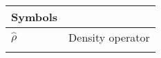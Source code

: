 \begin{center}
	\small
	\begin{longtable}{ll}
	\toprule
	Symbols & {} \\
	\bottomrule
	$\hat{\rho}$		& Density operator \\
	\etc{}					& \etc{} \\
	\hline
	\end{longtable}
\end{center}

